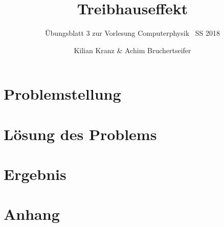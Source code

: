 \documentclass[12pt,a4paper,titlepage]{scrreprt}
\author{Kilian Kranz \& Achim Bruchertseifer}
\title{Treibhauseffekt}
\subtitle{Übungsblatt 3 zur Vorlesung \glqq Computerphysik\grqq~ SS 2018}
\begin{document}
	\maketitle
	\setcounter{chapter}{3}

	\section{Problemstellung}

	
	\section{Lösung des Problems}
	
	\section{Ergebnis}
	

	
	\section{Anhang}

	
\end{document}

